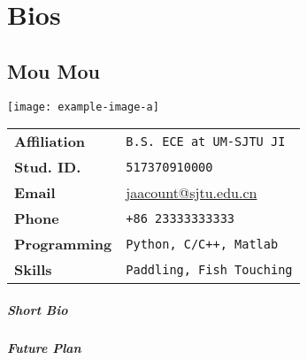 
\chapter{Bios}

\section{Mou Mou}
\begin{minipage}{0.25\textwidth}

\texttt{[image: example-image-a]}

\end{minipage}
\begin{minipage}{0.75\textwidth}\raggedright

\begin{tabular}{l l}
\textbf{Affiliation} & \texttt{B.S. ECE at UM-SJTU JI} \\
\textbf{Stud. ID.} & \texttt{517370910000} \\
\textbf{Email} & \url{jaacount@sjtu.edu.cn}\\
\textbf{Phone} & \texttt{+86 23333333333}\\
\textbf{Programming} & \texttt{Python, C/C++, Matlab} \\
\textbf{Skills} & \texttt{Paddling, Fish Touching}
\end{tabular}

\end{minipage}

\paragraph{Short Bio}
\blindtext

\paragraph{Future Plan}
\blindtext
